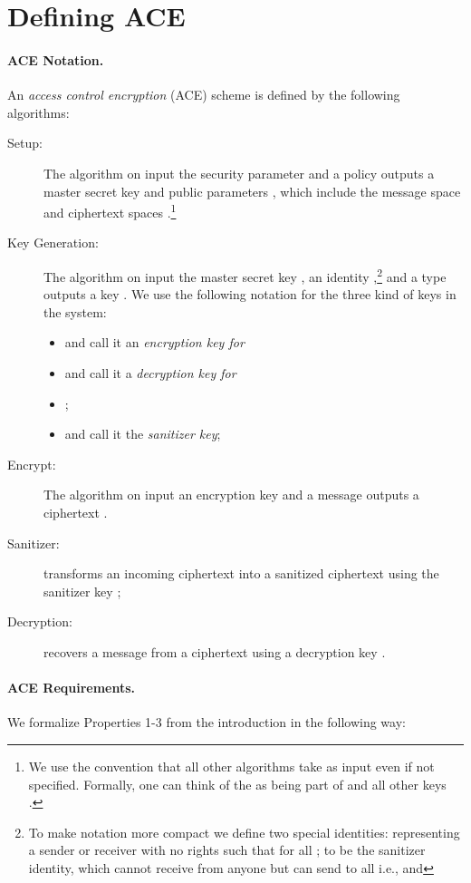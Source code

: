 \documentclass{llncs}
\begin{document}
\section{Defining ACE}\label{sec:definition}

\paragraph{ACE Notation.} An \emph{access control encryption} (ACE) scheme is defined by the following algorithms:
\begin{description}
\item[Setup:] The  algorithm on input the security parameter  and a policy  outputs a master secret key  and public parameters , which include the message space  and ciphertext spaces .\footnote{We use the convention that all other algorithms take  as input even if not specified. Formally, one can think of the  as being part of  and all other keys .} 

\item[Key Generation:] The  algorithm on input the master secret key , an identity ,\footnote{To make notation more compact we define two special identities:  representing a sender or receiver with no rights such that  for all ;  to be the sanitizer identity, which cannot receive from anyone but can send to all i.e.,  and } and a type  outputs a key . We use the following notation for the three kind of keys in the system:
	\begin{itemize}
	\item  and call it an \emph{encryption key for } 
	\item  and call it a \emph{decryption key for } 
	\item ;
	\item  and call it the \emph{sanitizer key};
	\end{itemize}

\item[Encrypt:] The  algorithm on input an encryption key  and a message  outputs a ciphertext . 

\item[Sanitizer:]  transforms an incoming ciphertext  into a sanitized ciphertext  using the sanitizer key ;

\item[Decryption:]  recovers a message  from a ciphertext  using a decryption key . \end{description}


\paragraph{ACE Requirements.} We formalize Properties 1-3 from the introduction in the following way: 
\end{document}
